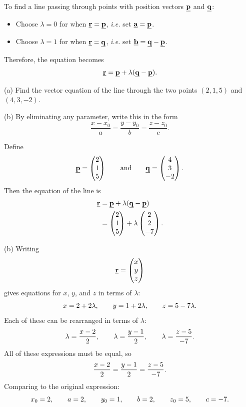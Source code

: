 To find a line passing through points with position vectors $\underline{\mathbf{p}}$ and $\underline{\mathbf{q}}$:
\begin{itemize}
\item Choose $\lambda=0$ for when $\underline{\mathbf{r}}=\underline{\mathbf{p}}$, \emph{i.e.} set $\underline{\mathbf{a}}=\underline{\mathbf{p}}$.
\item Choose $\lambda=1$ for when $\underline{\mathbf{r}}=\underline{\mathbf{q}}$, \emph{i.e.} set $\underline{\mathbf{b}}=\underline{\mathbf{q}}-\underline{\mathbf{p}}$.
\end{itemize}
Therefore, the equation becomes
\[
\underline{\mathbf{r}}=\underline{\mathbf{p}}+\lambda(\underline{\mathbf{q}}-\underline{\mathbf{p}}).
\]

\begin{example}[Lecture]
(a) Find the vector equation of the line through the two points $(2,1,5)$ and $(4,3,-2)$.

(b) By eliminating any parameter, write this in the form
\[
\frac{x-x_0}{a}=\frac{y-y_0}{b}=\frac{z-z_0}{c}.
\]
\end{example}

\begin{solution}
Define
\[
\underline{\mathbf{p}}=\begin{pmatrix}2\\1\\5\end{pmatrix}
\qquad\text{and}\qquad
\underline{\mathbf{q}}=\begin{pmatrix}4\\3\\-2\end{pmatrix}.
\]
Then the equation of the line is
\begin{align*}
    \underline{\mathbf{r}}&= \underline{\mathbf{p}}+\lambda(\underline{\mathbf{q}}-\underline{\mathbf{p}}) \\
             &= \begin{pmatrix}2\\1\\5\end{pmatrix}
 + \lambda\begin{pmatrix}2\\2\\-7\end{pmatrix}.
\end{align*}

(b) Writing
\[
\underline{\mathbf{r}}=\begin{pmatrix}x\\y\\z\end{pmatrix}
\]
gives equations for $x$, $y$, and $z$ in terms of $\lambda$:
\[
x=2+2\lambda,
\qquad
y=1+2\lambda,
\qquad
z=5-7\lambda.
\]
Each of these can be rearranged in terms of $\lambda$:
\[
\lambda= \frac{x-2}{2},
\qquad
\lambda= \frac{y-1}{2},
\qquad
\lambda= \frac{z-5}{-7}.
\]
All of these expressions must be equal, so
\[
\frac{x-2}{2}=\frac{y-1}{2}=\frac{z-5}{-7}.
\]
Comparing to the original expression:
\[
x_0= 2,
\qquad a= 2,
\qquad y_0= 1,
\qquad b= 2,
\qquad z_0= 5,
\qquad c= -7.
\]
\end{solution}

